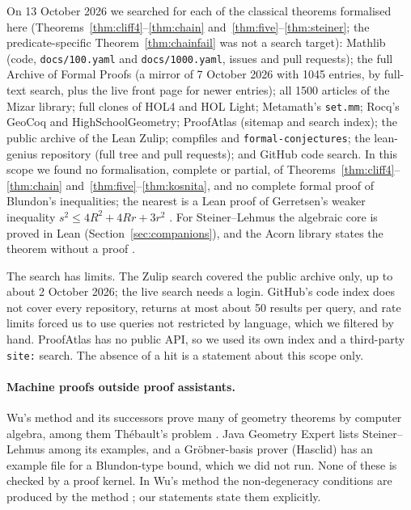 \documentclass[11pt]{article}
\theoremstyle{definition}
\theoremstyle{remark}
\newcommand{\lean}[1]{\texttt{#1}}
\begin{document}
On 13 October 2026 we searched for each of the classical theorems formalised here
(Theorems~\ref{thm:cliff4}--\ref{thm:chain} and~\ref{thm:five}--\ref{thm:steiner}; the predicate-specific
Theorem~\ref{thm:chainfail} was not a search target): Mathlib
(code, \texttt{docs/100.yaml} and \texttt{docs/1000.yaml}, issues and pull requests); the full
Archive of Formal Proofs \cite{afp} (a mirror of 7 October 2026 with 1045 entries, by full-text search,
plus the live front page for newer entries);
all 1500 articles of the Mizar library; full clones of HOL4 and HOL Light; Metamath's \texttt{set.mm};
Rocq's GeoCoq and HighSchoolGeometry; ProofAtlas (sitemap and search index); the public archive of
the Lean Zulip; compfiles and \texttt{formal-conjectures}; the lean-genius repository \cite{leangenius}
(full tree and pull requests); and GitHub code search. In this scope we found no formalisation,
complete or partial,
of Theorems~\ref{thm:cliff4}--\ref{thm:chain} and~\ref{thm:five}--\ref{thm:kosnita}, and no complete formal proof of Blundon's
inequalities; the nearest is a Lean proof of Gerretsen's weaker inequality $s^2\le4R^2+4Rr+3r^2$
\cite{leangeniusG}. For Steiner--Lehmus the algebraic core is proved in Lean \cite{leangeniusSL}
(Section~\ref{sec:companions}), and the Acorn library states the theorem without a proof
\cite{acornSL}.

The search has limits. The Zulip search covered the public archive only, up to about 2
October 2026; the live search needs a login. GitHub's code index does not cover every repository,
returns at most about 50 results per query, and rate limits forced us to use queries not restricted by
language, which we filtered by hand. ProofAtlas has no public API, so we used its own index and a
third-party \lean{site:} search. The absence of a hit is a statement about this scope only.

\paragraph{Machine proofs outside proof assistants.} Wu's method and its successors prove many of
geometry theorems by computer algebra, among them Th\'ebault's problem \cite{chou1988}. Java Geometry
Expert lists Steiner--Lehmus among its examples, and a Gr\"obner-basis prover (Hasclid) has an example
file for a Blundon-type bound, which we did not run. None of these is checked by a proof kernel. In
Wu's method the non-degeneracy conditions are produced by the method \cite{chou1988}; our statements
state them explicitly.
\end{document}
